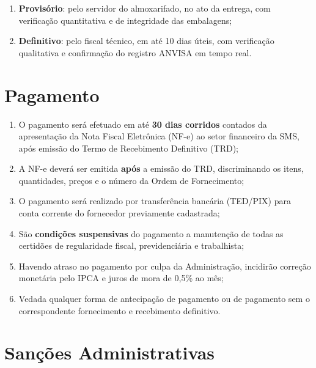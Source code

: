 \documentclass[12pt,a4paper]{article}
\begin{document}
\begin{enumerate}
  \item \textbf{Provisório}: pelo servidor do almoxarifado, no ato da entrega, com
    verificação quantitativa e de integridade das embalagens;
  \item \textbf{Definitivo}: pelo fiscal técnico, em até 10 dias úteis, com
    verificação qualitativa e confirmação do registro ANVISA em tempo real.
\end{enumerate}

\section{Pagamento}

\begin{enumerate}
  \item O pagamento será efetuado em até \textbf{30 dias corridos} contados da
    apresentação da Nota Fiscal Eletrônica (NF-e) ao setor financeiro da SMS,
    após emissão do Termo de Recebimento Definitivo (TRD);

  \item A NF-e deverá ser emitida \textbf{após} a emissão do TRD, discriminando
    os itens, quantidades, preços e o número da Ordem de Fornecimento;

  \item O pagamento será realizado por transferência bancária (TED/PIX) para conta
    corrente do fornecedor previamente cadastrada;

  \item São \textbf{condições suspensivas} do pagamento a manutenção de todas as
    certidões de regularidade fiscal, previdenciária e trabalhista;

  \item Havendo atraso no pagamento por culpa da Administração, incidirão correção
    monetária pelo IPCA e juros de mora de 0,5\% ao mês;

  \item Vedada qualquer forma de antecipação de pagamento ou de pagamento sem o
    correspondente fornecimento e recebimento definitivo.
\end{enumerate}

\section{Sanções Administrativas}
\end{document}
